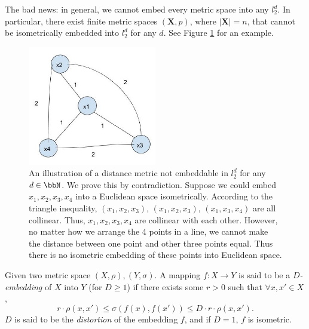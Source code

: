 The bad news: in general, we cannot embed every metric space into any $l_2^d$.
In particular, there exist finite metric spaces
$(\mathbf{X},p)$, where $|\mathbf{X}| = n$, that
cannot be isometrically embedded into $l_2^d$ for any $d$.
See Figure \ref{fig:unembeddable} for an example. 

\begin{figure}[h!]
\begin{center}
\includegraphics[width=0.5\textwidth]{chapter_5/files/unembeddable.jpg}
\caption{An illustration of a distance metric not embeddable in $l_2^d$ for any $d \in \bbN$.
We prove this by contradiction. Suppose we could embed $x_1, x_2, x_3, x_4$ into a Euclidean space isometrically.
According to the triangle inequality, $(x_1 ,x_2, x_3)$, $(x_1, x_2, x_3)$, $(x_1, x_3, x_4)$ are all collinear.
Thus, $x_1, x_2, x_3, x_4$ are collinear with each other.
However, no matter how we arrange the 4 points in a line,
we cannot make the distance between one point and other three points equal.
Thus there is no isometric embedding of these points into Euclidean space.}
\label{fig:unembeddable}
\end{center}
\end{figure}

\begin{definition}
Given two metric space $(X,\rho), (Y,\sigma)$. A mapping $f:
X\rightarrow Y$ is said to be a \emph{$D$-embedding} of $X$ into $Y$
(for $D\geq 1$) if there exists some $r>0$ such that $\forall x,x'
\in X$, 
\[
r \cdot \rho(x,x') \leq \sigma(f(x),f(x')) \leq D \cdot r \cdot
\rho(x,x').
\]
$D$ is said to be the \emph{distortion} of the embedding $f$, and if $D=1$, $f$ is isometric.
\end{definition}
